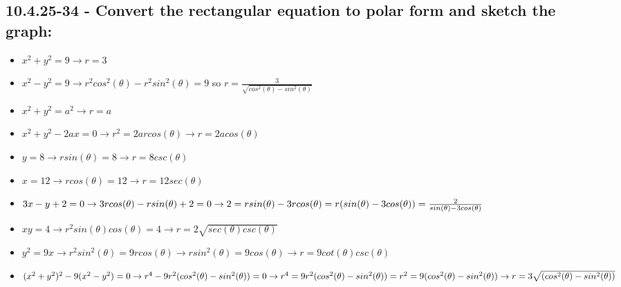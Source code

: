 \documentclass{article}
\begin{document}
\subsection{10.4.25-34 - Convert the rectangular equation to polar form and sketch the graph: }
\begin{itemize}
    \item  $x^{2} + y^{2} = 9 \rightarrow r = 3$
    \item $x^{2} - y^{2} = 9 \rightarrow r^{2}cos^{2}(\theta) - r^{2}sin^{2}(\theta) = 9$ so $r = \frac{3}{\sqrt{cos^{2}(\theta) - sin^{2}(\theta)}}$
    \item $x^{2} + y^{2} = a^{2} \rightarrow r = a$
    \item $x^{2} + y^{2} -2ax = 0 \rightarrow r^{2} = 2arcos(\theta) \rightarrow r = 2acos(\theta)$
    \item $y = 8 \rightarrow rsin(\theta) = 8 \rightarrow r = 8csc(\theta)$
    \item $x = 12 \rightarrow rcos(\theta) = 12 \rightarrow r = 12sec(\theta)$
    \item $3x - y + 2 = 0 \rightarrow 3rcos(\theta) - rsin(\theta) + 2 = 0 \rightarrow 2 = rsin(\theta) - 3rcos(\theta) = r(sin(\theta) - 3cos(\theta)) = \linebreak \frac{2}{sin(\theta) - 3cos(\theta)}$
    \item $xy = 4 \rightarrow r^{2}sin(\theta)cos(\theta) = 4 \rightarrow r = 2\sqrt{sec(\theta)csc(\theta)}$
    \item $y^{2} = 9x \rightarrow r^{2}sin^{2}(\theta) = 9rcos(\theta) \rightarrow rsin^{2}(\theta) = 9cos(\theta) \rightarrow r = 9cot(\theta)csc(\theta)$
    \item $(x^{2} + y^{2})^{2} - 9(x^{2} - y^{2}) = 0 \rightarrow r^{4} - 9r^{2}(cos^{2}(\theta) - sin^{2}(\theta)) = 0 \rightarrow r^{4} = 9r^{2}(cos^{2}(\theta) - sin^{2}(\theta)) = \linebreak r^{2} = 9(cos^{2}(\theta) - sin^{2}(\theta)) \rightarrow r = 3\sqrt{(cos^{2}(\theta) - sin^{2}(\theta))}$
\end{itemize}
\end{document}
